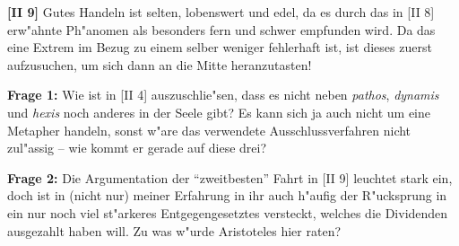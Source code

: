\documentclass[a4paper]{article}
\begin{document}
\noindent \textbf{[II 9]} Gutes Handeln ist selten, lobenswert und edel, da es durch das in [II 8] erw"ahnte Ph"anomen als besonders fern und schwer empfunden wird. Da das eine Extrem im Bezug zu einem selber weniger fehlerhaft ist, ist dieses zuerst aufzusuchen, um sich dann an die Mitte heranzutasten!\newline


\noindent \textbf{Frage 1:} Wie ist in [II 4] auszuschlie"sen, dass es nicht neben \emph{pathos}, \emph{dynamis} und \emph{hexis} noch anderes in der Seele gibt? Es kann sich ja auch nicht um eine Metapher handeln, sonst w"are das verwendete Ausschlussverfahren nicht zul"assig -- wie kommt er gerade auf diese drei?\newline

\noindent \textbf{Frage 2:} Die Argumentation der "`zweitbesten"' Fahrt in [II 9] leuchtet stark ein, doch ist in (nicht nur) meiner Erfahrung in ihr auch h"aufig der R"ucksprung in ein nur noch viel st"arkeres Entgegengesetztes versteckt, welches die Dividenden ausgezahlt haben will. Zu was w"urde Aristoteles hier raten?
\end{document}
